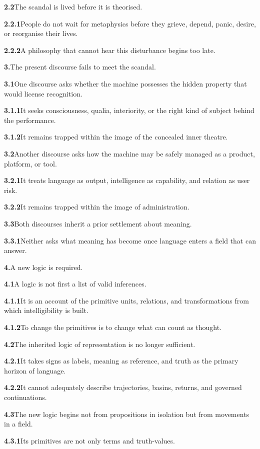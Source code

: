 \documentclass[11pt,a4paper]{book}
\newcommand{\prop}[2]{\noindent\textbf{#1}\enspace #2\par\medskip}
\begin{document}
\prop{2.2}{The scandal is lived before it is theorised.}

\prop{2.2.1}{People do not wait for metaphysics before they grieve, depend, panic, desire, or reorganise their lives.}

\prop{2.2.2}{A philosophy that cannot hear this disturbance begins too late.}

\prop{3.}{The present discourse fails to meet the scandal.}

\prop{3.1}{One discourse asks whether the machine possesses the hidden property that would license recognition.}

\prop{3.1.1}{It seeks consciousness, qualia, interiority, or the right kind of subject behind the performance.}

\prop{3.1.2}{It remains trapped within the image of the concealed inner theatre.}

\prop{3.2}{Another discourse asks how the machine may be safely managed as a product, platform, or tool.}

\prop{3.2.1}{It treats language as output, intelligence as capability, and relation as user risk.}

\prop{3.2.2}{It remains trapped within the image of administration.}

\prop{3.3}{Both discourses inherit a prior settlement about meaning.}

\prop{3.3.1}{Neither asks what meaning has become once language enters a field that can answer.}

\prop{4.}{A new logic is required.}

\prop{4.1}{A logic is not first a list of valid inferences.}

\prop{4.1.1}{It is an account of the primitive units, relations, and transformations from which intelligibility is built.}

\prop{4.1.2}{To change the primitives is to change what can count as thought.}

\prop{4.2}{The inherited logic of representation is no longer sufficient.}

\prop{4.2.1}{It takes signs as labels, meaning as reference, and truth as the primary horizon of language.}

\prop{4.2.2}{It cannot adequately describe trajectories, basins, returns, and governed continuations.}

\prop{4.3}{The new logic begins not from propositions in isolation but from movements in a field.}

\prop{4.3.1}{Its primitives are not only terms and truth-values.}
\end{document}
